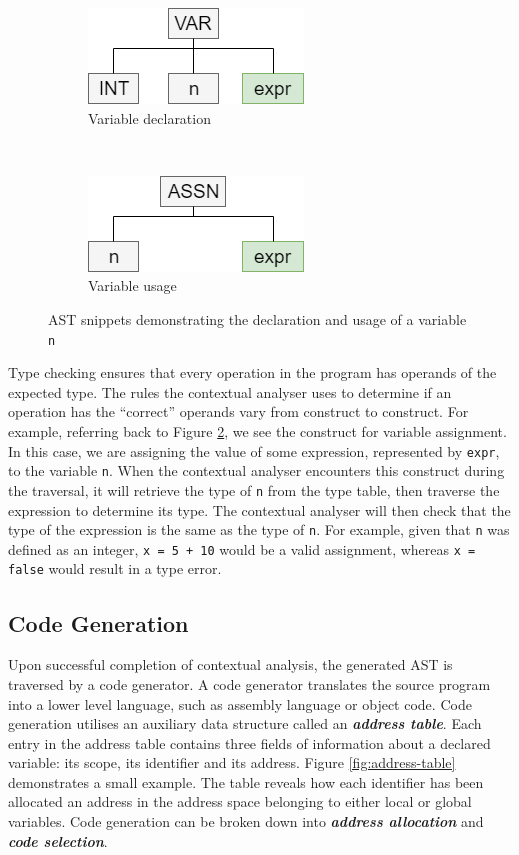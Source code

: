 \documentclass{l4proj}
\begin{document}
\begin{figure}[h]
	\centering
	\begin{subfigure}[b]{0.3\textwidth}
		\includegraphics[scale=0.65]{images/variable-decl.png}
		\caption{Variable declaration}
		\label{fig:variable-decl}
	\end{subfigure}
	~
	\begin{subfigure}[b]{0.3\textwidth}
		\includegraphics[scale=0.65]{images/variable-use.png}
		\caption{Variable usage}
		\label{fig:variable-use}
	\end{subfigure}
	\caption{AST snippets demonstrating the declaration and usage of a variable \texttt{n}}\label{fig:variable-decl-use}	
\end{figure}

Type checking ensures that every operation in the program has operands of the expected type. The rules the contextual analyser uses to determine if an operation has the ``correct'' operands vary from construct to construct. For example, referring back to Figure \ref{fig:variable-use}, we see the construct for variable assignment. In this case, we are assigning the value of some expression, represented by \texttt{expr}, to the variable \texttt{n}. When the contextual analyser encounters this construct during the traversal, it will retrieve the type of \texttt{n} from the type table, then traverse the expression to determine its type. The contextual analyser will then check that the type of the expression is the same as the type of \texttt{n}. For example, given that \texttt{n} was defined as an integer, \texttt{x = 5 + 10} would be a valid assignment, whereas \texttt{x = false} would result in a type error.

\subsection{Code Generation}
Upon successful completion of contextual analysis, the generated AST is traversed by a code generator. A code generator translates the source program into a lower level language, such as assembly language or object code. Code generation utilises an auxiliary data structure called an \textit{\textbf{address table}}. Each entry in the address table contains three fields of information about a declared variable: its scope, its identifier and its address. Figure \ref{fig:address-table} demonstrates a small example. The table reveals how each identifier has been allocated an address in the address space belonging to either local or global variables. Code generation can be broken down into \textit{\textbf{address allocation}} and \textit{\textbf{code selection}}.
\end{document}
